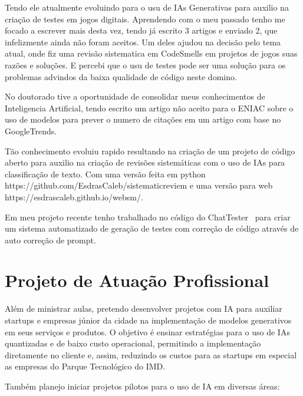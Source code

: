 \documentclass[10pt,a4paper,oneside]{book}
\begin{document}
Tendo ele atualmente evoluindo para o usu de IAs Generativas para auxilio na criação de testes em jogos digitais.
Aprendendo com o meu passado tenho me focado a escrever mais desta vez, tendo já escrito 3 artigos e enviado 2,
que infelizmente ainda não foram aceitos. Um deles ajudou na decisão pelo tema atual, onde fiz uma revisão sistematica
em CodeSmells em projetos de jogos suas razões e soluções.
E percebi que o usu de testes pode ser uma solução para os problemas advindos da baixa qualidade de código neste domino.

No doutorado tive a oportunidade de consolidar meus conhecimentos de Inteligencia Artificial, tendo escrito um artigo
não aceito para o ENIAC sobre o uso de modelos para prever o numero de citações em um artigo com base no GoogleTrends.

Tão conhecimento evoluiu rapido resultando na criação de um projeto de código aberto para auxilio na criação de revisões
sistemáticas com o uso de IAs para classificação de texto. Com uma versão feita em python https://github.com/EsdrasCaleb/sistematicreviem
e uma versão para web https://esdrascaleb.github.io/websm/.

Em meu projeto recente tenho trabalhado no código do ChatTester~\cite{yuan2023no} para criar um sistema automatizado de
geração de testes com correção de código através de auto correção de prompt.

\chapter{Projeto de Atuação Profissional}
\label{cap_proje}

Além de ministrar aulas, pretendo desenvolver projetos com IA para auxiliar startups e empresas júnior da cidade na
implementação de modelos generativos em seus serviços e produtos. O objetivo é ensinar estratégias para o uso de IAs
quantizadas e de baixo custo operacional, permitindo a implementação diretamente no cliente e, assim, reduzindo os
custos para as startups em especial as empresas do Parque Tecnológico do IMD.

Também planejo iniciar projetos pilotos para o uso de IA em diversas áreas:
\end{document}
